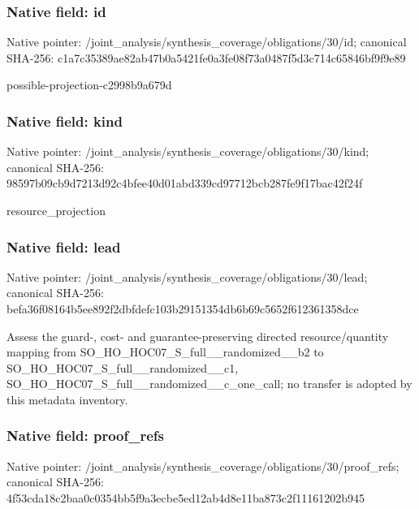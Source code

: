\documentclass[10pt,a4paper]{article}
\begin{document}
\subsubsection{Native field: id}
Native pointer: /joint\_\allowbreak{}analysis/synthesis\_\allowbreak{}coverage/obligations/30/id; canonical SHA-256: c1a7c35389ae82ab47b0a5421fe0a3fe08f73a0487f5d3c714c65846bf9f9e89

\begingroup\raggedright\sloppy possible-projection-c2998b9a679d\par\endgroup

\subsubsection{Native field: kind}
Native pointer: /joint\_\allowbreak{}analysis/synthesis\_\allowbreak{}coverage/obligations/30/kind; canonical SHA-256: 98597b09cb9d7213d92c4bfee40d01abd339cd97712bcb287fe9f17bac42f24f

\begingroup\raggedright\sloppy resource\_\allowbreak{}projection\par\endgroup

\subsubsection{Native field: lead}
Native pointer: /joint\_\allowbreak{}analysis/synthesis\_\allowbreak{}coverage/obligations/30/lead; canonical SHA-256: befa36f08164b5ee892f2dbfdefc103b29151354db6b69c5652f612361358dce

\begingroup\raggedright\sloppy Assess the guard-,\allowbreak{} cost- and guarantee-preserving directed resource/\allowbreak{}quantity mapping from SO\_\allowbreak{}HO\_\allowbreak{}HOC07\_\allowbreak{}S\_\allowbreak{}full\_\allowbreak{}\_\allowbreak{}randomized\_\allowbreak{}\_\allowbreak{}b2 to SO\_\allowbreak{}HO\_\allowbreak{}HOC07\_\allowbreak{}S\_\allowbreak{}full\_\allowbreak{}\_\allowbreak{}randomized\_\allowbreak{}\_\allowbreak{}c1,\allowbreak{} SO\_\allowbreak{}HO\_\allowbreak{}HOC07\_\allowbreak{}S\_\allowbreak{}full\_\allowbreak{}\_\allowbreak{}randomized\_\allowbreak{}\_\allowbreak{}c\_\allowbreak{}one\_\allowbreak{}call;\allowbreak{} no transfer is adopted by this metadata inventory.\par\endgroup

\subsubsection{Native field: proof\_\allowbreak{}refs}
Native pointer: /joint\_\allowbreak{}analysis/synthesis\_\allowbreak{}coverage/obligations/30/proof\_\allowbreak{}refs; canonical SHA-256: 4f53cda18c2baa0c0354bb5f9a3ecbe5ed12ab4d8e11ba873c2f11161202b945
\end{document}
